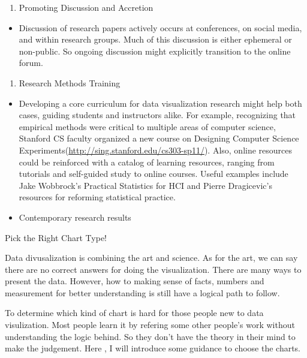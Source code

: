 \documentclass[]{book}
\providecommand{\tightlist}{%
  \setlength{\itemsep}{0pt}\setlength{\parskip}{0pt}}
\theoremstyle{definition}
\theoremstyle{definition}
\theoremstyle{definition}
\theoremstyle{remark}
\begin{document}
\begin{enumerate}
\def\labelenumi{\arabic{enumi}.}
\setcounter{enumi}{1}
\tightlist
\item
  Promoting Discussion and Accretion
\end{enumerate}

\begin{itemize}
\tightlist
\item
  Discussion of research papers actively occurs at conferences, on
  social media, and within research groups. Much of this discussion is
  either ephemeral or non-public. So ongoing discussion might explicitly
  transition to the online forum.
\end{itemize}

\begin{enumerate}
\def\labelenumi{\arabic{enumi}.}
\setcounter{enumi}{2}
\tightlist
\item
  Research Methods Training
\end{enumerate}

\begin{itemize}
\item
  Developing a core curriculum for data visualization research might
  help both cases, guiding students and instructors alike. For example,
  recognizing that empirical methods were critical to multiple areas of
  computer science, Stanford CS faculty organized a new course on
  Designing Computer Science
  Experiments(\url{http://sing.stanford.edu/cs303-sp11/}). Also, online
  resources could be reinforced with a catalog of learning resources,
  ranging from tutorials and self-guided study to online courses. Useful
  examples include Jake Wobbrock's Practical Statistics for HCI and
  Pierre Dragicevic's resources for reforming statistical practice.
\item
  Contemporary research results
\end{itemize}

Pick the Right Chart Type!

Data divusalization is combining the art and science. As for the art, we
can say there are no correct answers for doing the visualization. There
are many ways to present the data. However, how to making sense of
facts, numbers and measurement for better understanding is still have a
logical path to follow.

To determine which kind of chart is hard for those people new to data
visulization. Most people learn it by refering some other people's work
without understanding the logic behind. So they don't have the theory in
their mind to make the judgement. Here , I will introduce some guidance
to choose the charts.
\end{document}
